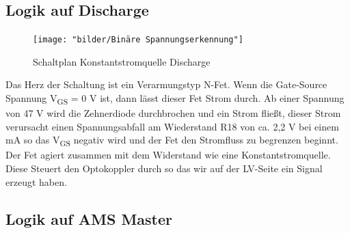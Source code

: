 \FloatBarrier
\subsection{Logik auf Discharge}
\label{sec: TSAL Logik Discharge}
\begin{figure}
	\centering
	\texttt{[image: "bilder/Binäre Spannungserkennung"]}
	\caption{Schaltplan Konstantstromquelle Discharge}
	\label{fig:binare-spannungserkennung}
\end{figure}

Das Herz der Schaltung ist ein Verarmungstyp N-Fet. Wenn die Gate-Source Spannung V\textsubscript{GS} = 0 V ist, dann lässt dieser Fet Strom durch. Ab einer Spannung von 47 V wird die Zehnerdiode durchbrochen und ein Strom fließt, dieser Strom verursacht einen Spannungsabfall am Wiederstand R18 von ca. 2,2 V bei einem mA so das V\textsubscript{GS} negativ wird und der Fet den Stromfluss zu begrenzen beginnt. Der Fet agiert zusammen mit dem Widerstand wie eine Konstantstromquelle. Diese Steuert den Optokoppler durch so das wir auf der \ac{LV}-Seite ein Signal erzeugt haben.

\FloatBarrier
\subsection{Logik auf \ac{AMS} Master}

